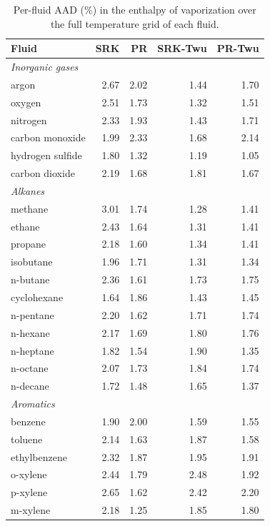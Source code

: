 \begin{table}[H]
\centering
\caption{Per-fluid AAD (\%) in the enthalpy of vaporization over the full temperature grid of each fluid.}
\label{tab:perfluidh}
\footnotesize
\begin{tabular}{lrrrr}
\toprule
Fluid & SRK & PR & SRK-Twu & PR-Twu \\
\midrule
\multicolumn{5}{l}{\itshape Inorganic gases}\\
\quad argon & 2.67 & 2.02 & 1.44 & 1.70 \\
\quad oxygen & 2.51 & 1.73 & 1.32 & 1.51 \\
\quad nitrogen & 2.33 & 1.93 & 1.43 & 1.71 \\
\quad carbon monoxide & 1.99 & 2.33 & 1.68 & 2.14 \\
\quad hydrogen sulfide & 1.80 & 1.32 & 1.19 & 1.05 \\
\quad carbon dioxide & 2.19 & 1.68 & 1.81 & 1.67 \\
\multicolumn{5}{l}{\itshape Alkanes}\\
\quad methane & 3.01 & 1.74 & 1.28 & 1.41 \\
\quad ethane & 2.43 & 1.64 & 1.31 & 1.41 \\
\quad propane & 2.18 & 1.60 & 1.34 & 1.41 \\
\quad isobutane & 1.96 & 1.71 & 1.31 & 1.34 \\
\quad n-butane & 2.36 & 1.61 & 1.73 & 1.75 \\
\quad cyclohexane & 1.64 & 1.86 & 1.43 & 1.45 \\
\quad n-pentane & 2.20 & 1.62 & 1.71 & 1.74 \\
\quad n-hexane & 2.17 & 1.69 & 1.80 & 1.76 \\
\quad n-heptane & 1.82 & 1.54 & 1.90 & 1.35 \\
\quad n-octane & 2.07 & 1.73 & 1.84 & 1.74 \\
\quad n-decane & 1.72 & 1.48 & 1.65 & 1.37 \\
\multicolumn{5}{l}{\itshape Aromatics}\\
\quad benzene & 1.90 & 2.00 & 1.59 & 1.55 \\
\quad toluene & 2.14 & 1.63 & 1.87 & 1.58 \\
\quad ethylbenzene & 2.32 & 1.87 & 1.95 & 1.91 \\
\quad o-xylene & 2.44 & 1.79 & 2.48 & 1.92 \\
\quad p-xylene & 2.65 & 1.62 & 2.42 & 2.20 \\
\quad m-xylene & 2.18 & 1.25 & 1.85 & 1.80 \\

\end{tabular}
\end{table}
